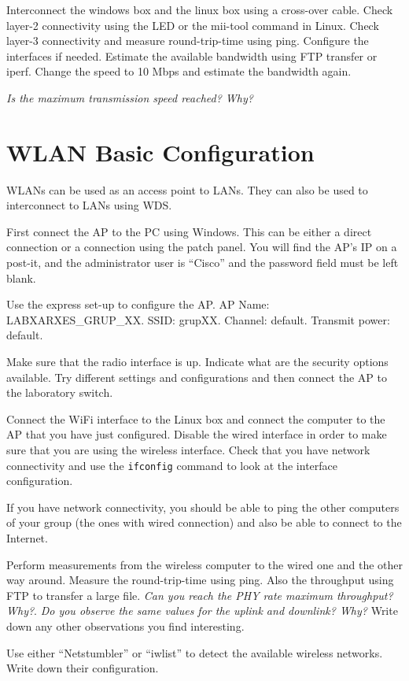 Interconnect the windows box and the linux box using a cross-over cable.
Check layer-2 connectivity using the LED or the mii-tool command in Linux.
Check layer-3 connectivity and measure round-trip-time using ping.
Configure the interfaces if needed.
Estimate the available bandwidth using FTP transfer or iperf.
Change the speed to 10 Mbps and estimate the bandwidth again.

\emph{Is the maximum transmission speed reached? Why?}

\section{WLAN Basic Configuration}

WLANs can be used as an access point to LANs.
They can also be used to interconnect to LANs using WDS.

First connect the AP to the PC using Windows.
This can be either a direct connection or a connection using the patch panel.
You will find the AP's IP on a post-it, and the administrator user is ``Cisco'' and the password field must be left blank.

Use the express set-up to configure the AP.
AP Name: LABXARXES\_GRUP\_XX.
SSID: grupXX.
Channel: default.
Transmit power: default.

Make sure that the radio interface is up.
Indicate what are the security options available.
Try different settings and configurations and then connect the AP to the laboratory switch.

Connect the WiFi interface to the Linux box and connect the computer to the AP that you have just configured.
Disable the wired interface in order to make sure that you are using the wireless interface.
Check that you have network connectivity and use the \texttt{ifconfig} command to look at the interface configuration.

If you have network connectivity, you should be able to ping the other computers of your group (the ones with wired connection) and also be able to connect to the Internet.

Perform measurements from the wireless computer to the wired one and the other way around.
Measure the round-trip-time using ping.
Also the throughput using FTP to transfer a large file.
\emph{Can you reach the PHY rate maximum throughput? Why?}.
\emph{Do you observe the same values for the uplink and downlink? Why?}
Write down any other observations you find interesting.

Use either ``Netstumbler'' or ``iwlist'' to detect the available wireless networks.
Write down their configuration.

